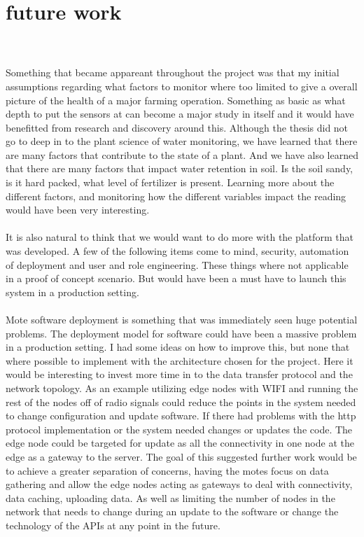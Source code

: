 \documentclass[]{uiophd}
\begin{document}
\section{future work}
\\\\
Something that became appareant throughout the project was that my initial assumptions regarding what factors to monitor where too limited to give  a overall picture of the health of a major farming operation. Something as basic as what depth to put the sensors at can become a  major study in itself and it would have benefitted from research and discovery around this. Although the thesis did not go to deep in to the plant science of water monitoring, we have learned that there are many factors that contribute to the state of a plant. And we have also learned that there are many factors that impact water retention in soil. Is the soil sandy, is it hard packed, what level of fertilizer is present. Learning more about the different factors, and monitoring how the different variables impact the reading would have been very interesting.
\\\\
It is also natural to think that we would want to do more with the platform that was developed. A few of the following items come to mind, security, automation of deployment and user and role engineering. These things where not applicable in a proof of concept scenario. But would have been a must have to  launch this system in a production setting.
\\\\
Mote software deployment is something that was immediately seen huge potential problems. The deployment model for software could have been a massive problem in a production setting. I had some ideas on how to improve this, but none that where possible to implement with the architecture chosen for the project. Here it would be interesting to invest more time in to the data transfer protocol and the network topology. As an example utilizing edge nodes with WIFI and running the rest of the nodes off of radio signals could reduce the points in the system needed to change configuration and update software. If there had problems with the http protocol implementation or the system needed changes or updates the code. The edge node could be targeted for update as all the connectivity in one node at the edge as a gateway to the server. The goal of this suggested further work would be to achieve a greater separation of concerns, having the motes focus on data gathering and allow the edge nodes acting as gateways to deal with connectivity, data caching, uploading data. As well as limiting the number of nodes in the network that needs to change during an update to the software or change the technology of the APIs at any point in the future.
\end{document}
